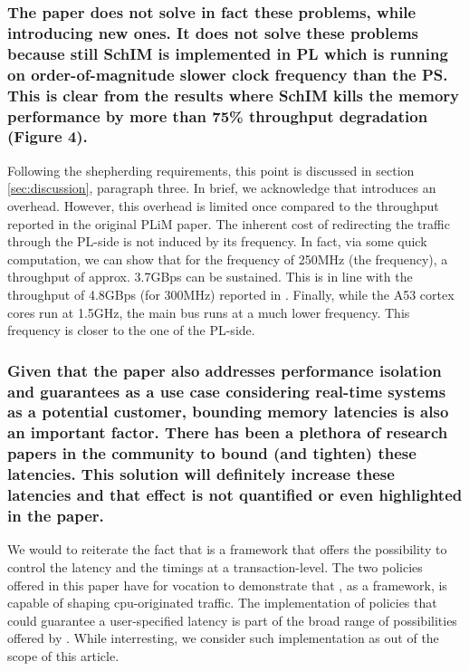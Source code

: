         \subsubsection{The paper does not solve in fact these problems, while introducing new ones. It does not solve these problems because still SchIM is implemented in PL which is running on order-of-magnitude slower clock frequency than the PS. This is clear from the results where SchIM kills the memory performance by more than 75\% throughput degradation (Figure 4).}
            Following the shepherding requirements, this point is discussed in section \ref{sec:discussion}, paragraph three.
            In brief, we acknowledge that \schim introduces an overhead. However, this overhead is limited once compared to the throughput reported in the original PLiM paper.
            The inherent cost of redirecting the traffic through the PL-side is not induced by its frequency. In fact, via some quick computation, we can show that for the frequency of 250MHz (the \schim frequency), a throughput of approx. 3.7GBps can be sustained. This is in line with the throughput of 4.8GBps (for 300MHz) reported in \cite{uiuc-xilinx-port-study}.
            Finally, while the A53 cortex cores run at 1.5GHz, the main bus runs at a much lower frequency. This frequency is closer to the one of the PL-side.

        \subsubsection{Given that the paper also addresses performance isolation and guarantees as a use case considering real-time systems as a potential customer, bounding memory latencies is also an important factor. There has been a plethora of research papers in the community to bound (and tighten) these latencies. This solution will definitely increase these latencies and that effect is not quantified or even highlighted in the paper.}
            We would to reiterate the fact that \schim is a framework that offers the possibility to control the latency and the timings at a transaction-level.
            The two policies offered in this paper have for vocation to demonstrate that \schim, as a framework, is capable of shaping cpu-originated traffic.
            The implementation of policies that could guarantee a user-specified latency is part of the broad range of possibilities offered by \schim.
            While interresting, we consider such implementation as out of the scope of this article.


